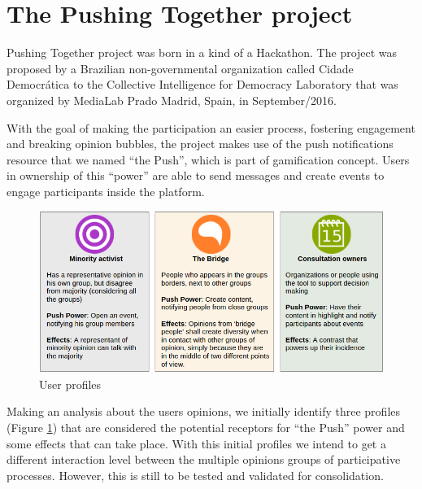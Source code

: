 \documentclass{llncs}
\begin{document}
\section{The Pushing Together project}
\label{sec:pushingtogether}

  Pushing Together project was born in a kind of a Hackathon. The project was
proposed by a Brazilian non-governmental organization called Cidade Democr\'atica
to the Collective Intelligence for Democracy Laboratory that was organized by
MediaLab Prado Madrid, Spain, in September/2016.

  With the goal of making the participation an easier process, fostering
engagement and breaking opinion bubbles, the project makes use of the
push notifications resource that we named ``the Push'', which is part of gamification
concept. Users in ownership of this ``power'' are able to send
messages and create events to engage participants inside the platform.

 \begin{figure}[hbt]
   \centering
     \includegraphics[keepaspectratio=true,scale=0.45]{images/userprofiles.png}
   \caption{User profiles}
   \label{fig:userprofiles}
 \end{figure}

  Making an analysis about the users opinions, we initially identify three
profiles (Figure \ref{fig:userprofiles}) that are considered the potential
receptors for ``the Push'' power and some effects that can take place. With this
initial profiles we intend to get a different interaction level between
the multiple opinions groups of participative processes. However, this is still
to be tested and validated for consolidation.
\end{document}
